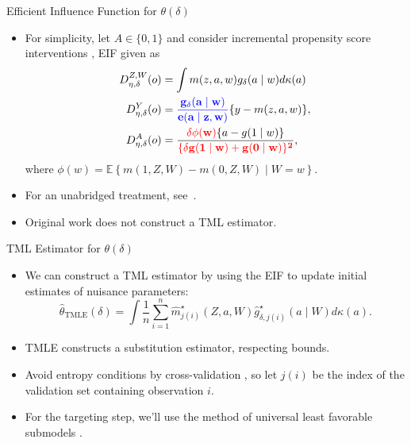 \documentclass{beamer}
\begin{document}

\begin{frame}[c]{Efficient Influence Function for $\theta(\delta)$}

\begin{center}
\begin{itemize}
\itemsep2pt
\item For simplicity, let $A \in \{0, 1\}$ and consider incremental propensity
  score interventions \citep{kennedy2017nonparametric}, EIF given as
  \vspace{-0.5em}
  \begin{align*}
    D^{Z, W}_{\eta, \delta}(o) &= \int m(z, a, w) g_{\delta}(a \mid w)
      d\kappa(a)\\
    D^Y_{\eta, \delta}(o) &= \mathbf{\textcolor{blue}{\frac{g_{\delta}(a \mid w)}
      {e(a \mid z, w)}}} \{y - m(z,a,w) \},\\
    D^A_{\eta,\delta}(o) &= \frac{\mathbf{\textcolor{red}{\delta\phi(w)}}\{a -
      g(1 \mid w)\}}{\mathbf{\textcolor{red}{\{\delta g(1 \mid w) +
      g(0 \mid w)\}^2}}},
  \end{align*}
  where $\phi(w) = \mathbb{E}\left\{m(1, Z, W) - m(0, Z, W) \mid W = w
  \right\}$.
\item For an unabridged treatment, see~\cite{diaz2019causal}.
\item Original work does not construct a TML estimator.
\end{itemize}
\end{center}

\note{
}

\end{frame}


\begin{frame}[c]{TML Estimator for $\theta(\delta)$}

\begin{center}
\begin{itemize}
\itemsep2pt
\item We can construct a TML estimator by using the EIF to update initial
  estimates of nuisance parameters:
    \begin{equation*}
      \hat{\theta}_{\text{TMLE}}(\delta) = \int \frac{1}{n} \sum_{i=1}^n
      \hat{m}^{\star}_{j(i)}(Z, a, W)
      \hat{g}_{\delta, j(i)}^{\star}(a \mid W) d\kappa(a).
    \end{equation*}
  \item TMLE constructs a substitution estimator, respecting bounds.
  \item Avoid entropy conditions by cross-validation \citep{zheng2011cross,
    chernozhukov2016double}, so let $j(i)$ be the index of the validation set
    containing observation $i$.
  \item For the targeting step, we'll use the method of universal least
    favorable submodels \citep{vdl2016one}.
\end{itemize}
\end{center}

\note{
}

\end{frame}
\end{document}
